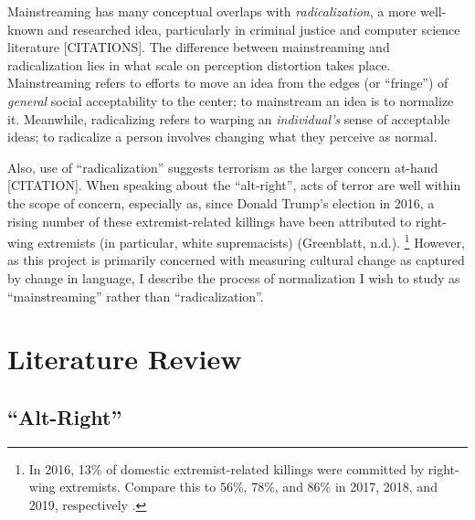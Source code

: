 \documentclass[acmlarge, screen, authorversion]{acmart}
\begin{document}
Mainstreaming has many conceptual overlaps with \textit{radicalization}, a more well-known and researched idea,
particularly in criminal justice and computer science literature [CITATIONS]. The
difference between mainstreaming and radicalization lies in what scale on
perception distortion takes place. Mainstreaming refers to efforts to move an idea from the edges
(or “fringe”) of \textit{general} social acceptability to the center; to mainstream an idea is to
normalize it. Meanwhile, radicalizing refers to warping an \textit{individual's} sense of acceptable
ideas; to radicalize a person involves changing what they perceive as normal.

Also, use of “radicalization” suggests terrorism as the larger
concern at-hand [CITATION]. When speaking about the “alt-right”, acts of
terror are well within the scope of concern, especially as, since Donald
Trump’s election in 2016, a rising number of these extremist-related
killings have been attributed to right-wing extremists (in particular,
white supremacists) (Greenblatt, n.d.). \footnote{In 2016, 13\% of domestic extremist-related
	killings were committed by right-wing extremists. Compare this to 56\%,
	78\%, and 86\% in 2017, 2018, and 2019, respectively \cite{greenblattRightWingExtremistViolence}.
} However, as this project is primarily concerned with
measuring cultural change as captured by change in language, I describe
the process of normalization I wish to study as “mainstreaming” rather
than “radicalization”. 

\section{Literature Review}




\subsection{``Alt-Right''}
\end{document}
